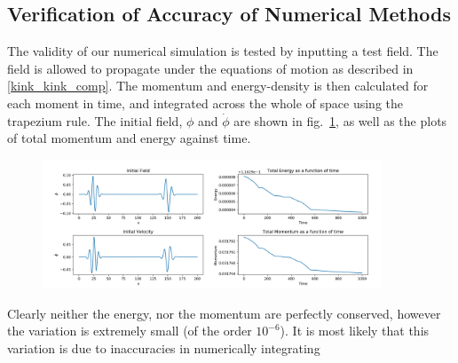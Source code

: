 \documentclass[11pt, oneside]{article}  	%
\numberwithin{equation}{section}
\begin{document}
 \subsection{Verification of Accuracy of Numerical Methods}\label{tests}
 The validity of our numerical simulation is tested by inputting a test field. The field is allowed to propagate under the equations of motion as described in \textsection \ref{kink_kink_comp}. The momentum and energy-density is then calculated for each moment in time, and integrated across the whole of space using the trapezium rule. The initial field, $\phi$ and $\dot{\phi}$ are shown in fig.~\ref{test_field}, as well as the plots of total momentum and energy against time.\par
\begin{figure}
\centering
\includegraphics[width=0.9\textwidth]{test_field_energy.png}
 \label{test_field}
\end{figure}
Clearly neither the energy, nor the momentum are perfectly conserved, however the variation is extremely small (of the order $10^{-6}$). It is most likely that this variation is due to inaccuracies in numerically integrating 


\end{document}
